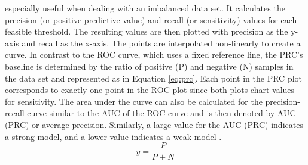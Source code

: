 especially useful when dealing with an imbalanced data set. It calculates the 
precision (or positive predictive value) and recall (or sensitivity) values 
for each feasible threshold. The 
resulting values are then plotted with precision as the y-axis and 
recall as the x-axis. The points are interpolated non-linearly to 
create a curve. 
In contrast to the ROC curve, which uses a fixed reference line, the PRC's 
baseline is determined by the ratio of positive (P) and negative (N) samples in 
the data set and represented as in Equation \ref{eq:prc}. Each point in the PRC 
plot corresponds to exactly one point in the ROC plot since both plots chart 
values for sensitivity. The area under the curve can also be 
calculated for the precision-recall curve similar to the AUC of the ROC curve 
and is then denoted by AUC (PRC) or average precision. Similarly, a large value 
for the AUC (PRC) indicates a strong model, and a lower value indicates a weak 
model \cite{RN160, RN161}.
\begin{equation}
 y = \frac{P}{P + N}
 \label{eq:prc}
\end{equation}
